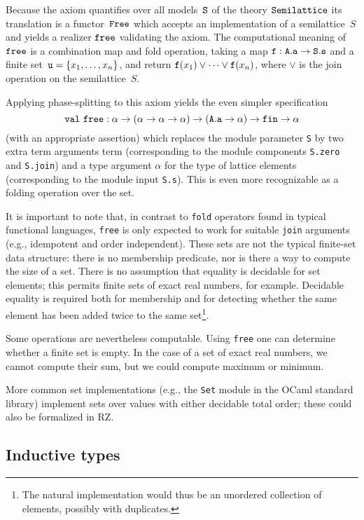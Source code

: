 %
Because the axiom quantifies over all models~$\mathtt{S}$ of the theory
$\mathtt{Semilattice}$ its translation is a functor~$\mathtt{Free}$ which
accepts an implementation of a semilattice~$S$ and yields a realizer
$\mathtt{free}$ validating the axiom. The computational meaning of
$\mathtt{free}$ is a combination map and fold operation, taking a map
$\mathtt{f} : \mathtt{A.a} \to \mathtt{S.s}$ and a finite set~$\mathtt{u} = \{x_1,
  \ldots, x_n\}$, and return $\mathtt{f}(x_1) \vee \cdots \vee \mathtt{f}(x_n)$,
where $\vee$ is the join operation on the semilattice~$S$.

Applying phase-splitting to this axiom yields the even simpler
specification
\[
\mathtt{val}\ \mathtt{free} : \alpha \to (\alpha \to \alpha \to \alpha) \to (\mathtt{A.a}\to\alpha) \to \mathtt{fin} \to \alpha	
\]
(with an appropriate assertion)
which replaces the module parameter \texttt{S} by two extra term arguments term (corresponding to the module components \texttt{S.zero} and \texttt{S.join}) 
and a type argument $\alpha$ for the type of lattice elements (corresponding to the module input \texttt{S.s}).  This is even
more recognizable as a folding operation over the set.


It is important to note that, in contrast to \texttt{fold} operators found in typical functional
languages, \texttt{free} is only expected to work for suitable \texttt{join} arguments (e.g., idempotent and order independent).  These
sets are not the typical finite-set data structure: there is no membership predicate, nor
is there a way to compute the size of a set.  There is no
assumption that equality is decidable for set elements; this permits
finite sets of  exact real numbers, for example.  Decidable equality
is required both for membership and for detecting
whether the same element has been added twice to the same set\footnote{The natural implementation would thus
be an unordered collection of elements, possibly with duplicates.}.

Some operations are nevertheless computable.  Using \texttt{free} one
can determine whether a finite set is empty.  In the case of a set of exact
real numbers, we cannot compute their sum, but we could compute maximum or minimum.

More common set implementations (e.g., the \texttt{Set} module in the OCaml standard library)
implement sets over values with either decidable total order; these could also be
formalized in RZ.

\subsection{Inductive types}
\label{sec:inductive-types}

